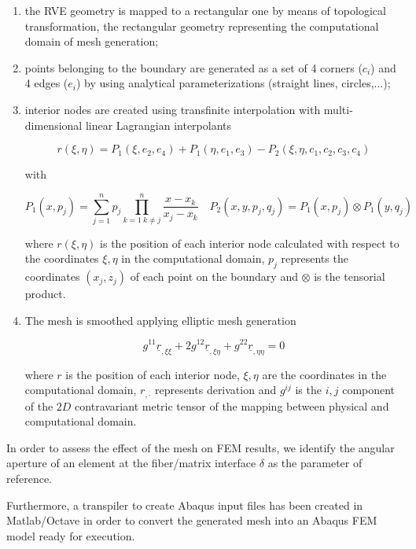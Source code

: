 \documentclass[a4paper]{jpconf}
\begin{document}
\begin{enumerate}
\item the RVE geometry is mapped to a rectangular one by means of topological transformation, the rectangular geometry representing the computational domain of mesh generation;
\item points belonging to the boundary are generated as a set of 4 corners ($c_{i}$) and 4 edges ($e_{i}$) by using analytical parameterizations (straight lines, circles,...);
\item interior nodes are created using transfinite interpolation with multi-dimensional linear Lagrangian interpolants

\begin{equation}
r(\xi,\eta)=P_{1}(\xi,e_{2},e_{4})+P_{1}(\eta,e_{1},e_{3})- P_{2}(\xi,\eta,c_{1},c_{2},c_{3},c_{4})
\end{equation}

with

\begin{equation}
P_{1}(x,p_{j})=\sum_{j=1}^{n}p_{j}\prod_{k=1\ k\neq j}^{n}\frac{x-x_{k}}{x_{j}-x_{k}}\quad P_{2}(x,y,p_{j},q_{j})=P_{1}(x,p_{j})\otimes P_{1}(y,q_{j})
\end{equation}

where $r(\xi,\eta)$ is the position of each interior node calculated with respect to the coordinates $\xi,\eta$ in the computational domain, $p_{j}$ represents the coordinates $\left(x_{j},z_{j}\right)$ of each point on the boundary and $\otimes$ is the tensorial product.

\item The mesh is smoothed applying elliptic mesh generation

\begin{equation}
g^{11}\underline{r}_{,\xi\xi}+2g^{12}\underline{r}_{,\xi\eta}+g^{22}\underline{r}_{,\eta\eta}=0
\end{equation}

where $r$ is the position of each interior node, $\xi,\eta$ are the coordinates in the computational domain, $r_{,\cdot}$ represents derivation and $g^{ij}$ is the $i,j$ component of the $2D$ contravariant metric tensor of the mapping between physical and computational domain. 
\end{enumerate}
In order to assess the effect of the mesh on FEM results, we identify the angular aperture of an element at the fiber/matrix interface $\delta$ as the parameter of reference.\par Furthermore, a transpiler to create Abaqus input files has been created in Matlab/Octave in order to convert the generated mesh into an Abaqus FEM model ready for execution.\par
\end{document}
